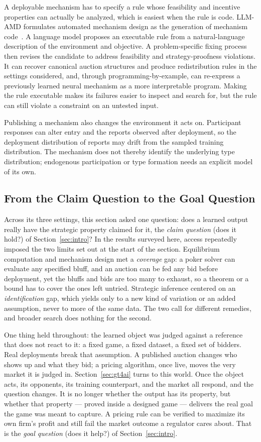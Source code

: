A deployable mechanism has to specify a rule whose feasibility and incentive properties can actually be analyzed, which is easiest when the rule
is code.
LLM-AMD formulates automated mechanism design as the generation of mechanism
code~\citep{LiuGuoConitzer2025}. A language model proposes an executable rule from
a natural-language description of the environment and objective. A
problem-specific fixing process then revises the candidate to address feasibility
and strategy-proofness violations. It can recover canonical auction structures and
produce redistribution rules in the settings considered, and, through
programming-by-example, can re-express a previously learned neural mechanism as a
more interpretable program. Making the rule executable makes its failures easier to inspect and search for, but the rule can still
violate a constraint on an untested input.

Publishing a mechanism also changes the environment it acts on. Participant
responses can alter entry and the reports observed after deployment, so the
deployment distribution of reports may drift from the sampled training
distribution. The mechanism does not thereby identify the underlying type
distribution; endogenous participation or type formation needs an explicit model
of its own.

\subsection{From the Claim Question to the Goal Question}
\label{sec:ai4gt:bridge}

Across its three settings, this section asked one question: does a learned output
really have the strategic property claimed for it, the \emph{claim question}
(does it hold?) of Section~\ref{sec:intro}? In the results surveyed here, access
repeatedly imposed the two limits set out at the start of the section. Equilibrium
computation and mechanism design met a \emph{coverage} gap: a poker solver can
evaluate any specified bluff, and an auction can be fed any bid before deployment,
yet the bluffs and bids are too many to exhaust, so a theorem or a bound has to cover
the ones left untried. Strategic inference centered on an \emph{identification} gap, which
yields only to a new kind of variation or an added assumption, never to more of the
same data. The two call for different remedies, and broader search does nothing for
the second.

One thing held throughout: the learned object was judged against a reference that does not react to it: a fixed game, a fixed
dataset, a fixed set of bidders. Real
deployments break that assumption. A published auction changes who shows up and what
they bid; a pricing algorithm, once live, moves the very market it is judged in.
Section~\ref{sec:gt4ai} turns to this world. Once the object acts, its opponents, its
training counterpart, and the market all respond, and the question changes. It is no
longer whether the output has its property, but whether that property --- proved
inside a designed game --- delivers the real goal the game was meant to capture. A
pricing rule can be verified to maximize its own firm's profit and still fail the
market outcome a regulator cares about. That is the \emph{goal question} (does it help?) of Section~\ref{sec:intro}.
